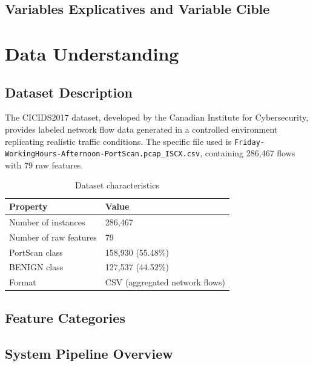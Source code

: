 \subsection{Variables Explicatives and Variable Cible}

\section{Data Understanding}

\subsection{Dataset Description}

The CICIDS2017 dataset, developed by the Canadian Institute for Cybersecurity, provides labeled network flow data generated in a controlled environment replicating realistic traffic conditions. The specific file used is \texttt{Friday-WorkingHours-Afternoon-PortScan.pcap\_ISCX.csv}, containing 286,467 flows with 79 raw features.

\begin{table}[H]
\centering
\caption{Dataset characteristics}
\begin{tabular}{ll}
\toprule
\textbf{Property} & \textbf{Value} \\
\midrule
Number of instances & 286,467 \\
Number of raw features & 79 \\
PortScan class & 158,930 (55.48\%) \\
BENIGN class & 127,537 (44.52\%) \\
Format & CSV (aggregated network flows) \\
\bottomrule
\end{tabular}
\end{table}

\subsection{Feature Categories}

\subsection{System Pipeline Overview}

